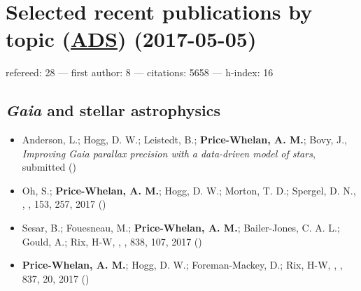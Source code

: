 \documentclass[12pt,letterpaper]{article}
\begin{document}
\section*{Selected recent publications by topic (\href{\adsurl}{ADS}) (2017-05-05)}
    refereed: 28 ---
    first author: 8 ---
    citations: 5658 ---
    h-index: 16

    \vspace{1em}

	\subsection*{\textbf{\textit{Gaia}} and stellar astrophysics}
	\begin{itemize}

\item Anderson, L.; Hogg, D. W.; Leistedt, B.; {\bf Price-Whelan, A. M.}; Bovy, J.,
    {\it Improving Gaia parallax precision with a data-driven model of stars},
    submitted ()

\item Oh, S.; {\bf Price-Whelan, A. M.}; Hogg, D. W.; Morton, T. D.; Spergel, D. N.,
    ,
    \aj, 153, 257, 2017 ()

\item Sesar, B.; Fouesneau, M.; {\bf Price-Whelan, A. M.}; Bailer-Jones, C. A. L.; Gould, A.; Rix, H-W,
    ,
    \apj, 838, 107, 2017 ()

\item {\bf Price-Whelan, A. M.}; Hogg, D. W.; Foreman-Mackey, D.; Rix, H-W,
    ,
    \apj, 837, 20, 2017 ()

    \end{itemize}
\end{document}
